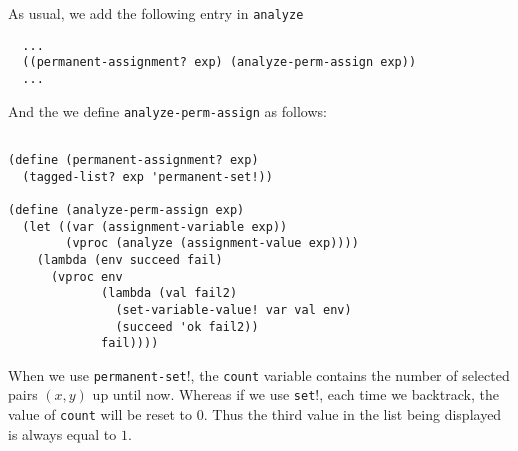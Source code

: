 \documentclass[a4paper,12pt]{article}
\begin{document}
As usual, we add the following entry in \lstinline!analyze!

\begin{lstlisting}
  ...
  ((permanent-assignment? exp) (analyze-perm-assign exp))
  ...
\end{lstlisting}

And the we define \lstinline!analyze-perm-assign! as follows:

\begin{lstlisting}

(define (permanent-assignment? exp)
  (tagged-list? exp 'permanent-set!))

(define (analyze-perm-assign exp)
  (let ((var (assignment-variable exp))
        (vproc (analyze (assignment-value exp))))
    (lambda (env succeed fail)
      (vproc env
             (lambda (val fail2)
               (set-variable-value! var val env)
               (succeed 'ok fail2))
             fail))))
\end{lstlisting}

When we use \lstinline!permanent-set!!, the \lstinline!count! variable
contains the number of selected pairs $(x, y)$ up until now.
Whereas if we use \lstinline!set!!, each time we backtrack, the value
of \lstinline!count! will be reset to $0$.  Thus the third value in
the list being displayed is always equal to $1$.
\end{document}
